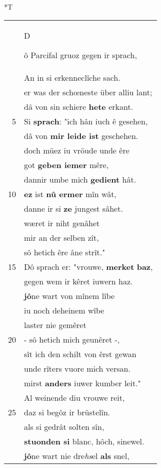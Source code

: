 \documentclass[8pt,a4paper,notitlepage]{article}
\begin{document}
\begin{table}[ht]
\begin{minipage}[t]{0.5\linewidth}
\small
\begin{center}*T
\end{center}
\begin{tabular}{rl}
 & \begin{large}D\end{large}ô Parcifal gruoz gegen ir sprach,\\ 
 & An in si erkenneclîche sach.\\ 
 & er was der schœneste über alliu lant;\\ 
 & dâ von sin schiere \textbf{hete} erkant.\\ 
5 & Si \textbf{sprach}: "ich hân iuch ê gesehen,\\ 
 & dâ von \textbf{mir leide ist} geschehen.\\ 
 & doch müez iu vröude unde êre\\ 
 & got \textbf{geben iemer} mêre,\\ 
 & dannir umbe mich \textbf{gedient} hât.\\ 
10 & \textbf{ez} ist \textbf{nû ermer} mîn wât,\\ 
 & danne ir si \textbf{ze} jungest sâhet.\\ 
 & wæret ir niht genâhet\\ 
 & mir an der selben zît,\\ 
 & sô hetich êre âne strît."\\ 
15 & Dô sprach er: "vrouwe, \textbf{merket} \textbf{baz},\\ 
 & gegen wem ir kêret iuwern haz.\\ 
 & \textbf{jô}ne wart von mînem lîbe\\ 
 & iu noch deheinem wîbe\\ 
 & laster nie gemêret\\ 
20 & - sô hetich mich geunêret -,\\ 
 & sît ich den schilt von êrst gewan\\ 
 & unde rîters vuore mich versan.\\ 
 & mirst \textbf{anders} iuwer kumber leit."\\ 
 & Al weinende diu vrouwe reit,\\ 
25 & daz si begôz ir brüstelîn.\\ 
 & als si gedrât solten sîn,\\ 
 & \textbf{stuonden si} blanc, hôch, sinewel.\\ 
 & \textbf{jô}ne wart nie dre\textit{hs}el \textbf{als} snel,\\ 

\end{tabular}
\end{minipage}
\end{table}
\end{document}
